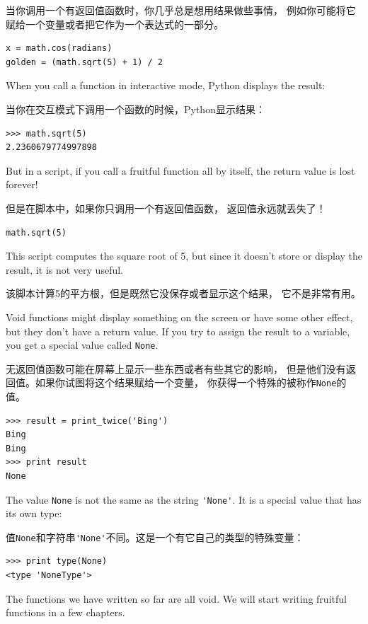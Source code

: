 \documentclass[10pt]{book}
\begin{document}
\begin{CJK}{UTF8}{gbsn}
当你调用一个有返回值函数时，你几乎总是想用结果做些事情，
例如你可能将它赋给一个变量或者把它作为一个表达式的一部分。

\begin{verbatim}
x = math.cos(radians)
golden = (math.sqrt(5) + 1) / 2
\end{verbatim}
%
When you call a function in interactive mode, Python displays
the result:

当你在交互模式下调用一个函数的时候，Python显示结果：

\begin{verbatim}
>>> math.sqrt(5)
2.2360679774997898
\end{verbatim}
%
But in a script, if you call a fruitful function all by itself,
the return value is lost forever!

但是在脚本中，如果你只调用一个有返回值函数，
返回值永远就丢失了！

\begin{verbatim}
math.sqrt(5)
\end{verbatim}
%
This script computes the square root of 5, but since it doesn't store
or display the result, it is not very useful.

该脚本计算5的平方根，但是既然它没保存或者显示这个结果，
它不是非常有用。

Void functions might display something on the screen or have some
other effect, but they don't have a return value.  If you try to
assign the result to a variable, you get a special value called
{\tt None}.

无返回值函数可能在屏幕上显示一些东西或者有些其它的影响，
但是他们没有返回值。如果你试图将这个结果赋给一个变量，
你获得一个特殊的被称作{\tt None}的值。

\begin{verbatim}
>>> result = print_twice('Bing')
Bing
Bing
>>> print result
None
\end{verbatim}
%
The value {\tt None} is not the same as the string \verb"'None'". 
It is a special value that has its own type:

值{\tt None}和字符串\verb"'None'"不同。这是一个有它自己的类型的特殊变量：

\begin{verbatim}
>>> print type(None)
<type 'NoneType'>
\end{verbatim}
%
The functions we have written so far are all void.  We will start
writing fruitful functions in a few chapters.


\end{CJK}
\end{document}
